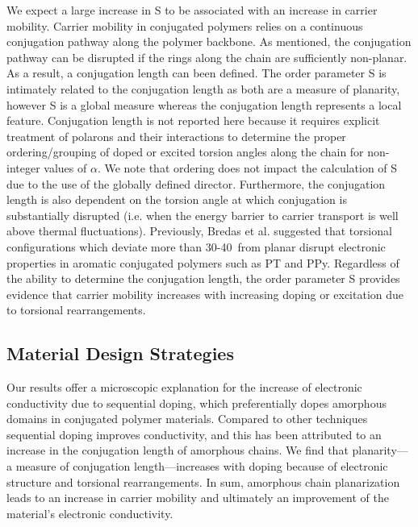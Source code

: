We expect a large increase in S to be associated with an increase in carrier mobility. Carrier mobility in conjugated polymers relies on a continuous conjugation pathway along the polymer backbone.\cite{Shin2010} As mentioned, the conjugation pathway can be disrupted if the rings along the chain are sufficiently non-planar. As a result, a conjugation length can been defined. The order parameter S is intimately related to the conjugation length as both are a measure of planarity, however S is a global measure whereas the conjugation length represents a local feature. Conjugation length is not reported here because it requires explicit treatment of polarons and their interactions to determine the proper ordering/grouping of doped or excited torsion angles along the chain for non-integer values of $\alpha$. We note that ordering does not impact the calculation of S due to the use of the globally defined director. Furthermore, the conjugation length is also dependent on the torsion angle at which conjugation is substantially disrupted (i.e. when the energy barrier to carrier transport is well above thermal fluctuations). Previously, Bredas et al. suggested that torsional configurations which deviate more than 30-40\textdegree \ from planar disrupt electronic properties in aromatic conjugated polymers such as PT and PPy.\cite{Bredas1985} Regardless of the ability to determine the conjugation length, the order parameter S provides evidence that carrier mobility increases with increasing doping or excitation due to torsional rearrangements.

\subsection{Material Design Strategies}

Our results offer a microscopic explanation for the increase of electronic conductivity due to sequential doping, which preferentially dopes amorphous domains in conjugated polymer materials.\cite{Chew2017, Jacobs2016} Compared to other techniques sequential doping improves conductivity, and this has been attributed to an increase in the conjugation length of amorphous chains.\cite{Chew2017} We find that planarity---a measure of conjugation length---increases with doping because of electronic structure and torsional rearrangements. In sum, amorphous chain planarization leads to an increase in carrier mobility and ultimately an improvement of the material's electronic conductivity.

